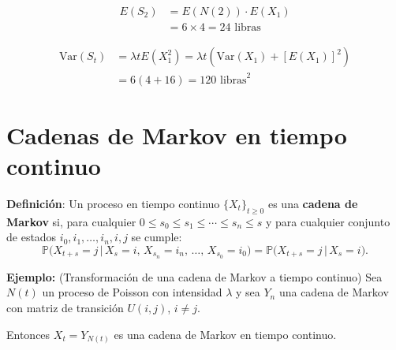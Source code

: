 \documentclass[12pt,a4paper]{article}
\newcommand{\definicion}[1]{%
\begin{definicionbox}
\textbf{Definición}: #1
\end{definicionbox}
}
\begin{document}
\begin{align*}
E(S_2) &= E(N(2)) \cdot E(X_1) \\
&= 6 \times 4 = 24 \text{ libras}
\end{align*}

\begin{align*}
\text{Var}(S_t) &= \lambda t E(X_1^2) = \lambda t \left(\text{Var}(X_1) + [E(X_1)]^2\right) \\
&= 6(4 + 16) = 120 \text{ libras}^2
\end{align*}

\section{Cadenas de Markov en tiempo continuo}

\definicion{Un proceso en tiempo continuo $\{X_t\}_{t \geq 0}$ es una \textbf{cadena de Markov} si, 
para cualquier $0 \leq s_0 \leq s_1 \leq \cdots \leq s_n \leq s$ y para cualquier conjunto de estados $i_0, i_1, \dots, i_n, i, j$ se cumple:
\begin{equation*}
\mathbb{P}\bigl(X_{t+s} = j \,\big|\, X_s = i,\, X_{s_n} = i_n,\, \dots,\, X_{s_0} = i_0 \bigr)
= 
\mathbb{P}\bigl(X_{t+s} = j \,\big|\, X_s = i \bigr).
\end{equation*}}

\textbf{Ejemplo:} (Transformación de una cadena de Markov a tiempo continuo) Sea $N(t)$ un proceso de Poisson con intensidad $\lambda$ y sea $Y_n$ una cadena de Markov con matriz de transición $U(i,j)$, $i \neq j$.

Entonces $X_t = Y_{N(t)}$ es una cadena de Markov en tiempo continuo.

\begin{center}
\end{center}
\end{document}
